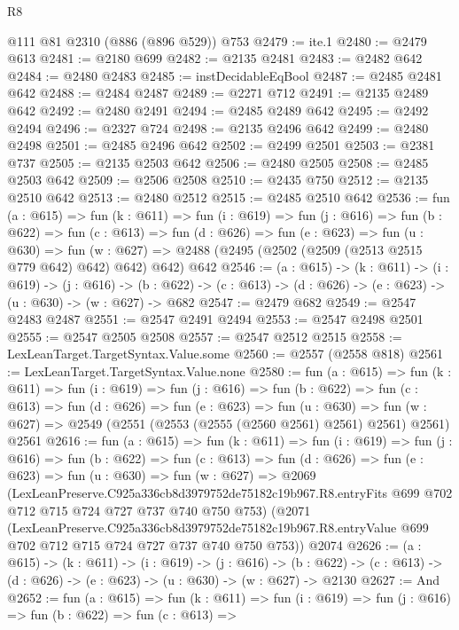 \begin{lexlean}{R8}
\begin{coremodule}
    @111
    @81
    @2310
    (@886 (@896 @529))
    @753
@2479 := ite.{1}
@2480 := @2479 @613
@2481 := @2180 @699
@2482 := @2135 @2481
@2483 := @2482 @642
@2484 := @2480 @2483
@2485 := instDecidableEqBool
@2487 := @2485 @2481 @642
@2488 := @2484 @2487
@2489 := @2271 @712
@2491 := @2135 @2489 @642
@2492 := @2480 @2491
@2494 := @2485 @2489 @642
@2495 := @2492 @2494
@2496 := @2327 @724
@2498 := @2135 @2496 @642
@2499 := @2480 @2498
@2501 := @2485 @2496 @642
@2502 := @2499 @2501
@2503 := @2381 @737
@2505 := @2135 @2503 @642
@2506 := @2480 @2505
@2508 := @2485 @2503 @642
@2509 := @2506 @2508
@2510 := @2435 @750
@2512 := @2135 @2510 @642
@2513 := @2480 @2512
@2515 := @2485 @2510 @642
@2536 := fun (a : @615) =>
  fun (k : @611) =>
  fun (i : @619) =>
  fun (j : @616) =>
  fun (b : @622) =>
  fun (c : @613) =>
  fun (d : @626) =>
  fun (e : @623) =>
  fun (u : @630) =>
  fun (w : @627) => @2488 (@2495 (@2502 (@2509 (@2513 @2515 @779 @642) @642) @642) @642) @642
@2546 := (a : @615) ->
  (k : @611) ->
  (i : @619) ->
  (j : @616) ->
  (b : @622) -> (c : @613) -> (d : @626) -> (e : @623) -> (u : @630) -> (w : @627) -> @682
@2547 := @2479 @682
@2549 := @2547 @2483 @2487
@2551 := @2547 @2491 @2494
@2553 := @2547 @2498 @2501
@2555 := @2547 @2505 @2508
@2557 := @2547 @2512 @2515
@2558 := LexLeanTarget.TargetSyntax.Value.some
@2560 := @2557 (@2558 @818)
@2561 := LexLeanTarget.TargetSyntax.Value.none
@2580 := fun (a : @615) =>
  fun (k : @611) =>
  fun (i : @619) =>
  fun (j : @616) =>
  fun (b : @622) =>
  fun (c : @613) =>
  fun (d : @626) =>
  fun (e : @623) =>
  fun (u : @630) =>
  fun (w : @627) => @2549 (@2551 (@2553 (@2555 (@2560 @2561) @2561) @2561) @2561) @2561
@2616 := fun (a : @615) =>
  fun (k : @611) =>
  fun (i : @619) =>
  fun (j : @616) =>
  fun (b : @622) =>
  fun (c : @613) =>
  fun (d : @626) =>
  fun (e : @623) =>
  fun (u : @630) =>
  fun (w : @627) =>
  @2069
    (LexLeanPreserve.C925a336cb8d3979752de75182c19b967.R8.entryFits
      @699
      @702
      @712
      @715
      @724
      @727
      @737
      @740
      @750
      @753)
    (@2071
      (LexLeanPreserve.C925a336cb8d3979752de75182c19b967.R8.entryValue
        @699
        @702
        @712
        @715
        @724
        @727
        @737
        @740
        @750
        @753))
    @2074
@2626 := (a : @615) ->
  (k : @611) ->
  (i : @619) ->
  (j : @616) ->
  (b : @622) -> (c : @613) -> (d : @626) -> (e : @623) -> (u : @630) -> (w : @627) -> @2130
@2627 := And
@2652 := fun (a : @615) =>
  fun (k : @611) =>
  fun (i : @619) =>
  fun (j : @616) =>
  fun (b : @622) =>
  fun (c : @613) =>

\end{coremodule}
\end{lexlean}
